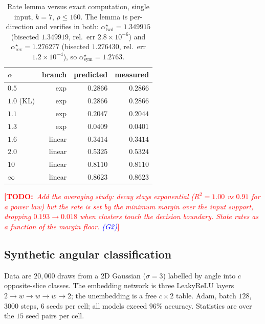 \documentclass[10pt,letterpaper,twocolumn]{article}
\newcommand{\TODO}[1]{\textcolor{red}{\small\textbf{[TODO:}~\textit{#1}\textbf{]}}}
\newcommand{\GATE}[1]{\textcolor{blue}{\textsf{\scriptsize (#1)}}}
\theoremstyle{plain}
\theoremstyle{definition}
\theoremstyle{remark}
\begin{document}
\begin{table}[t]
\centering\small
\caption{Rate lemma versus exact computation, single input, $k=7$,
$\rho\le160$. The lemma is per-direction and verifies in both:
$\alpha^{\star}_{\mathrm{fwd}}=1.349915$ (bisected $1.349919$, rel.\ err
$2.8\times10^{-6}$) and $\alpha^{\star}_{\mathrm{rev}}=1.276277$ (bisected
$1.276430$, rel.\ err $1.2\times10^{-4}$), so
$\alpha^{\star}_{\mathrm{sym}}=1.2763$.}
\label{tab:gate1}
\begin{tabular}{@{}lrrr@{}}
\toprule
$\alpha$ & branch & predicted & measured \\
\midrule
$0.5$      & exp    & $0.2866$ & $0.2866$ \\
$1.0$ (KL) & exp    & $0.2866$ & $0.2866$ \\
$1.1$      & exp    & $0.2047$ & $0.2044$ \\
$1.3$      & exp    & $0.0409$ & $0.0401$ \\
$1.6$      & linear & $0.3414$ & $0.3414$ \\
$2.0$      & linear & $0.5325$ & $0.5324$ \\
$10$       & linear & $0.8110$ & $0.8110$ \\
$\infty$   & linear & $0.8623$ & $0.8623$ \\
\bottomrule
\end{tabular}
\end{table}

\TODO{Add the averaging study: decay stays exponential ($R^{2}=1.00$ vs $0.91$
for a power law) but the rate is set by the \emph{minimum margin over the input
support}, dropping $0.193\to0.018$ when clusters touch the decision boundary.
State rates as a function of the margin floor. \GATE{G2}}

\subsection{Synthetic angular classification}
\label{sec:exp-synthetic}

Data are $20{,}000$ draws from a $2$D Gaussian ($\sigma=3$) labelled by angle
into $c$ opposite-slice classes. The embedding network is three LeakyReLU
layers $2\!\to\!w\!\to\!w\!\to\!w\!\to\!2$; the unembedding is a free
$c\times2$ table. Adam, batch $128$, $3000$ steps, $6$ seeds per cell; all
models exceed $96\%$ accuracy. Statistics are over the $15$ seed pairs per
cell.
\end{document}
